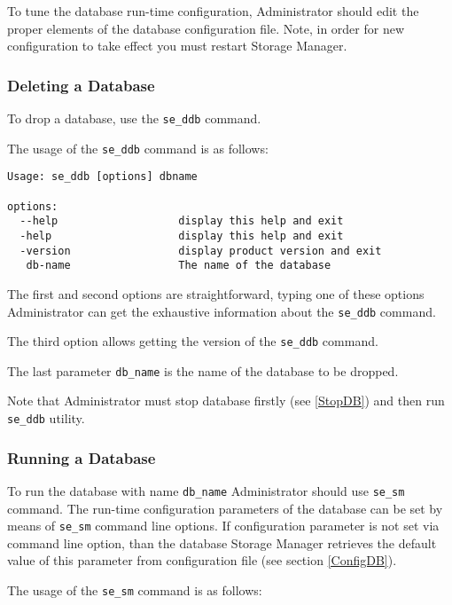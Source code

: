 \documentclass[a4paper,12pt]{article}
\begin{document}
To tune the database run-time configuration, Administrator should edit the proper elements of the database configuration file. Note, in order for new configuration to take effect you must restart Storage Manager.

\subsubsection{Deleting a Database}

To drop a database, use the \verb!se_ddb! command.

The usage of the \verb!se_ddb! command is as follows:

\begin{verbatim}
Usage: se_ddb [options] dbname

options:
  --help                   display this help and exit
  -help                    display this help and exit
  -version                 display product version and exit
   db-name                 The name of the database
\end{verbatim}

The first and second options are straightforward, typing one of these options Administrator can get the exhaustive information about the \verb!se_ddb! command.

The third option allows getting the version of the \verb!se_ddb! command.

The last parameter \verb!db_name! is the name of the database to be dropped.

Note that Administrator must stop database firstly (see \ref{StopDB}) and then run \verb!se_ddb! utility. 

\subsubsection{Running a Database}
\label{RunDB}

To run the database with name \verb!db_name! Administrator should use \verb!se_sm! command. The run-time configuration parameters of the database can be set by means of \verb!se_sm! command line options. If configuration parameter is not set via command line option, than the database Storage Manager retrieves the default value of this parameter from configuration file (see section \ref{ConfigDB}).

The usage of the \verb!se_sm! command is as follows:
\end{document}
